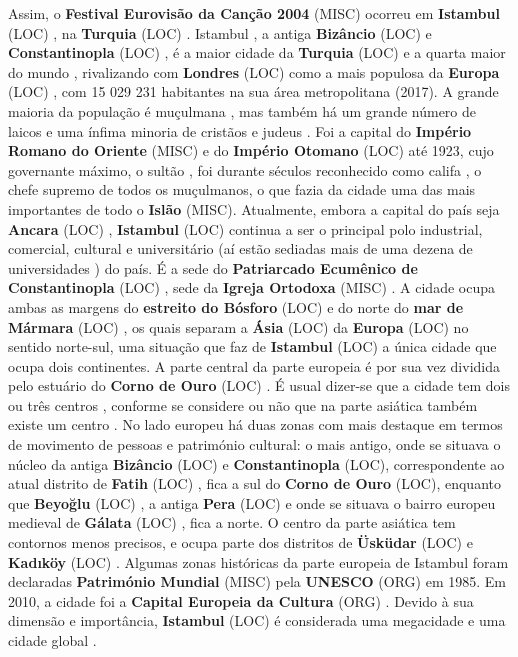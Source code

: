 \documentclass[12pt,a4paper]{article}
\begin{document}
Assim, o \textbf{Festival Eurovisão da Canção 2004} (MISC) ocorreu em \textbf{Istambul} (LOC) , na \textbf{Turquia} (LOC) . Istambul , a antiga \textbf{Bizâncio} (LOC) e \textbf{Constantinopla} (LOC) , é a maior cidade da \textbf{Turquia} (LOC) e a quarta maior do mundo , rivalizando com \textbf{Londres} (LOC) como a mais populosa da \textbf{Europa} (LOC) , com 15 029 231 habitantes na sua área metropolitana (2017). A grande maioria da população é muçulmana , mas também há um grande número de laicos e uma ínfima minoria de cristãos e judeus . Foi a capital do \textbf{Império Romano do Oriente} (MISC) e do \textbf{Império Otomano} (LOC) até 1923, cujo governante máximo, o sultão , foi durante séculos reconhecido como califa , o chefe supremo de todos os muçulmanos, o que fazia da cidade uma das mais importantes de todo o \textbf{Islão} (MISC). Atualmente, embora a capital do país seja \textbf{Ancara} (LOC) , \textbf{Istambul} (LOC) continua a ser o principal polo industrial, comercial, cultural e universitário (aí estão sediadas mais de uma dezena de universidades ) do país. É a sede do \textbf{Patriarcado Ecumênico de Constantinopla} (LOC) , sede da \textbf{Igreja Ortodoxa} (MISC) . A cidade ocupa ambas as margens do \textbf{estreito do Bósforo} (LOC) e do norte do \textbf{mar de Mármara} (LOC) , os quais separam a \textbf{Ásia} (LOC) da \textbf{Europa} (LOC) no sentido norte-sul, uma situação que faz de \textbf{Istambul} (LOC) a única cidade que ocupa dois continentes. A parte central da parte europeia é por sua vez dividida pelo estuário do \textbf{Corno de Ouro} (LOC) . É usual dizer-se que a cidade tem dois ou três centros , conforme se considere ou não que na parte asiática também existe um centro . No lado europeu há duas zonas com mais destaque em termos de movimento de pessoas e património cultural: o mais antigo, onde se situava o núcleo da antiga \textbf{Bizâncio} (LOC) e \textbf{Constantinopla} (LOC), correspondente ao atual distrito de \textbf{Fatih} (LOC) , fica a sul do \textbf{Corno de Ouro} (LOC), enquanto que \textbf{Beyoğlu} (LOC) , a antiga \textbf{Pera} (LOC) e onde se situava o bairro europeu medieval de \textbf{Gálata} (LOC) , fica a norte. O centro da parte asiática tem contornos menos precisos, e ocupa parte dos distritos de \textbf{Üsküdar} (LOC) e \textbf{Kadıköy} (LOC) . Algumas zonas históricas da parte europeia de Istambul foram declaradas \textbf{Património Mundial} (MISC) pela \textbf{UNESCO} (ORG) em 1985. Em 2010, a cidade foi a \textbf{Capital Europeia da Cultura} (ORG) . Devido à sua dimensão e importância, \textbf{Istambul} (LOC) é considerada uma megacidade e uma cidade global .
\end{document}
